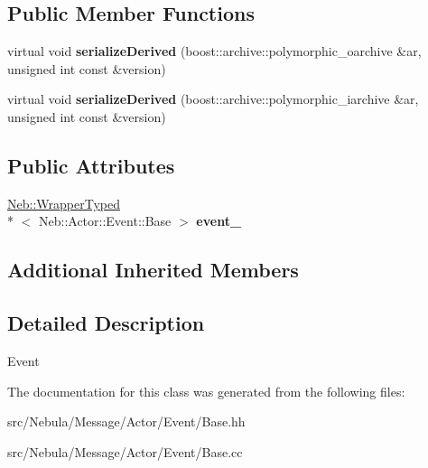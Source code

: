 \subsection*{Public Member Functions}
\begin{DoxyCompactItemize}
\item 
\hypertarget{classNeb_1_1Message_1_1Actor_1_1Event_a99cbd29786ba044e63a80eb1c065aaec}{virtual void {\bfseries serialize\-Derived} (boost\-::archive\-::polymorphic\-\_\-oarchive \&ar, unsigned int const \&version)}\label{classNeb_1_1Message_1_1Actor_1_1Event_a99cbd29786ba044e63a80eb1c065aaec}

\item 
\hypertarget{classNeb_1_1Message_1_1Actor_1_1Event_a0b593d0085c258e6c0a931a4ff6402b3}{virtual void {\bfseries serialize\-Derived} (boost\-::archive\-::polymorphic\-\_\-iarchive \&ar, unsigned int const \&version)}\label{classNeb_1_1Message_1_1Actor_1_1Event_a0b593d0085c258e6c0a931a4ff6402b3}

\end{DoxyCompactItemize}
\subsection*{Public Attributes}
\begin{DoxyCompactItemize}
\item 
\hypertarget{classNeb_1_1Message_1_1Actor_1_1Event_ae873cfb5d7b37e3509aabf26d281f30c}{\hyperlink{classNeb_1_1WrapperTyped}{Neb\-::\-Wrapper\-Typed}\\*
$<$ Neb\-::\-Actor\-::\-Event\-::\-Base $>$ {\bfseries event\-\_\-}}\label{classNeb_1_1Message_1_1Actor_1_1Event_ae873cfb5d7b37e3509aabf26d281f30c}

\end{DoxyCompactItemize}
\subsection*{Additional Inherited Members}


\subsection{Detailed Description}
Event 

The documentation for this class was generated from the following files\-:\begin{DoxyCompactItemize}
\item 
src/\-Nebula/\-Message/\-Actor/\-Event/Base.\-hh\item 
src/\-Nebula/\-Message/\-Actor/\-Event/Base.\-cc\end{DoxyCompactItemize}
